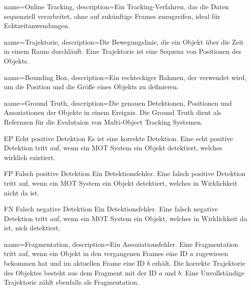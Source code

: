 {
name=Online Tracking,
description={Ein Tracking-Verfahren, das die Daten sequenziell verarbeitet, ohne auf zukünftige Frames zuzugreifen, ideal für Echtzeitanwendungen.}
}

{
name=Trajektorie,
description={Die Bewegungslinie, die ein Objekt über die Zeit in einem Raum durchläuft. Eine Trajektorie ist eine Sequenz von Positionen des Objekts.}
}

{
name=Bounding Box,
description={Ein rechteckiger Rahmen, der verwendet wird, um die Position und die Größe eines Objekts zu definieren.}
}

{
name=Ground Truth,
description={Die genauen Detektionen, Positionen und Assoziationen der Objekte in einem Ereignis. Die Ground Truth dient als Refernzen für die Evalutaion von Multi-Object Tracking Systemen.}
}




\newglossaryentrywithacronym
{EP}
{Echt positive Detektion}
{Es ist eine korrekte Detektion. Eine echt positive Detektion tritt auf, wenn ein MOT System ein Objekt detektiert, welches wirklich existiert.}

\newglossaryentrywithacronym
{FP}
{Falsch positive Detektion}
{Ein Detektionsfehler. Eine falsch positive Detektion tritt auf, wenn ein MOT System ein Objekt detektiert, welches in Wirklichkeit nicht da ist.}

\newglossaryentrywithacronym
{FN}
{Falsch negative Detektion}
{Ein Detektionsfehler. Eine falsch negative Detektion tritt auf, wenn ein MOT System ein Objekt, welches in Wirklichkeit da ist, nich detektiert.}

{
name=Fragmentation,
description={Ein Assoziationsfehler. Eine Fragmentation tritt auf, wenn ein Objekt in den vergangenen Frames eine ID \(a\) zugewiesen bekommen hat und im aktuellen Frame eine ID \(b\) erhält. Die korrekte Trajektorie des Objektes besteht aus dem Fragment mit der ID \(a\) und \(b\). Eine Unvollständige Trajektorie zählt ebenfalls als Fragmentation.}
}

